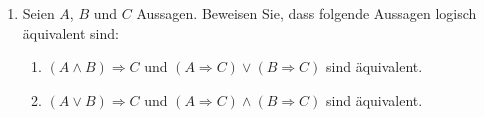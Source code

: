 \begin{enumerate}
    \item Seien \( A \), \( B \) und \( C \) Aussagen. Beweisen Sie, dass folgende Aussagen logisch äquivalent sind:
    \begin{enumerate}
        \item \( (A \land B) \Rightarrow C \) und \( (A \Rightarrow C) \lor (B \Rightarrow C) \) sind äquivalent.
        \item \( (A \lor B) \Rightarrow C \) und \( (A \Rightarrow C) \land (B \Rightarrow C) \) sind äquivalent.
    \end{enumerate}
\end{enumerate}